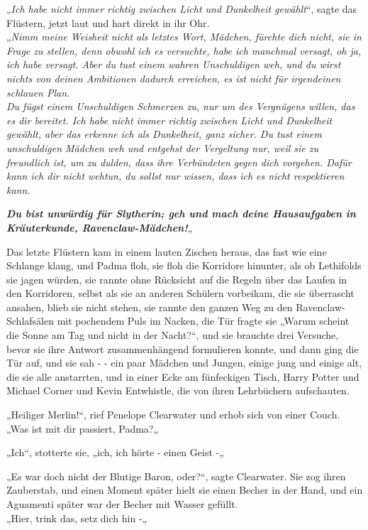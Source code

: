{„\emph{Ich habe nicht immer richtig zwischen Licht und Dunkelheit gewählt}“, sagte das Flüstern, jetzt laut und hart direkt in ihr Ohr.\\ „\emph{Nimm meine Weisheit nicht als letztes Wort, Mädchen, fürchte dich nicht, sie in Frage zu stellen, denn obwohl ich es versuchte, habe ich manchmal versagt, oh ja, ich habe versagt. Aber du tust einem wahren Unschuldigen weh, und du wirst nichts von deinen Ambitionen dadurch erreichen, es ist nicht für irgendeinen schlauen Plan.\\ Du fügst einem Unschuldigen Schmerzen zu, nur um des Vergnügens willen, das es dir bereitet. Ich habe nicht immer richtig zwischen Licht und Dunkelheit gewählt, aber das erkenne ich als Dunkelheit, ganz sicher. Du tust einem unschuldigen Mädchen weh und entgehst der Vergeltung nur, weil sie zu freundlich ist, um zu dulden, dass ihre Verbündeten gegen dich vorgehen. Dafür kann ich dir nicht wehtun, du sollst nur wissen, dass ich es nicht respektieren kann.}

\textbf{\emph{Du bist unwürdig für Slytherin; geh und mach deine Hausaufgaben in Kräuterkunde, Ravenclaw-Mädchen!}}„

Das letzte Flüstern kam in einem lauten Zischen heraus, das fast wie eine Schlange klang, und Padma floh, sie floh die Korridore hinunter, als ob Lethifolds sie jagen würden, sie rannte ohne Rücksicht auf die Regeln über das Laufen in den Korridoren, selbst als sie an anderen Schülern vorbeikam, die sie überrascht ansahen, blieb sie nicht stehen, sie rannte den ganzen Weg zu den Ravenclaw-Schlafsälen mit pochendem Puls im Nacken, die Tür fragte sie „Warum scheint die Sonne am Tag und nicht in der Nacht?“, und sie brauchte drei Versuche, bevor sie ihre Antwort zusammenhängend formulieren konnte, und dann ging die Tür auf, und sie sah - - ein paar Mädchen und Jungen, einige jung und einige alt, die sie alle anstarrten, und in einer Ecke am fünfeckigen Tisch, Harry Potter und Michael Corner und Kevin Entwhistle, die von ihren Lehrbüchern aufschauten.

„Heiliger Merlin!“, rief Penelope Clearwater und erhob sich von einer Couch.\\ „Was ist mit dir passiert, Padma?„

„Ich“, stotterte sie, „ich, ich hörte - einen Geist -„

„Es war doch nicht der Blutige Baron, oder?“, sagte Clearwater. Sie zog ihren Zauberstab, und einen Moment später hielt sie einen Becher in der Hand, und ein Aguamenti später war der Becher mit Wasser gefüllt.\\ „Hier, trink das, setz dich hin -„

}

